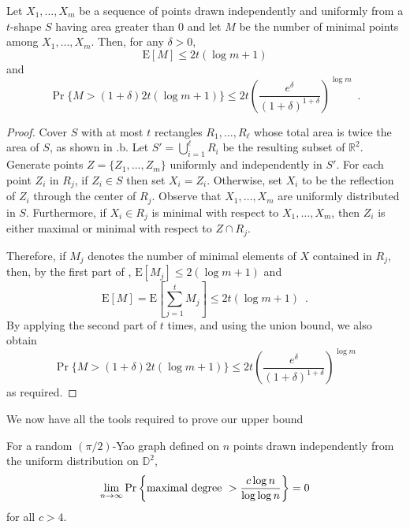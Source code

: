 \documentclass[lotsofwhite,charterfonts]{patmorin}
\newcommand{\RR}{\mathbb{R}}
\newcommand{\D}{\mathbb{D}}
\newcommand{\PROB}{\Pr}
\newcommand{\EXP}{\mathrm{E}}
\begin{document}
\begin{lem}
  Let $X_1,\ldots,X_m$ be a sequence of points drawn independently and
  uniformly from a $t$-shape $S$ having area greater than
  0 and let $M$ be the number of minimal points
  among $X_1,\ldots,X_m$.  Then, for any $\delta >0$,
  \begin{equation}
    \EXP[M] \le 2t(\log m + 1)
  \end{equation}
  and 
  \begin{equation}
    \PROB\{M>(1+\delta)2t(\log m+1)\} 
        \le 2t\left(\frac{e^\delta}{(1+\delta)^{1+\delta}}\right)^{\log m} 
	\enspace .
  \end{equation}
\end{lem}

\begin{proof}
Cover $S$ with at most $t$ rectangles $R_1,\ldots,R_\ell$ whose total area
is twice the area of $S$, as shown in .b.  Let
$S'=\bigcup_{i=1}^\ell R_i$ be the resulting subset of $\RR^2$.  Generate
points $Z=\{Z_1,\ldots,Z_m\}$ uniformly and independently in $S'$.  For each
point $Z_i$ in $R_j$, if $Z_i\in S$ then set $X_i=Z_i$.  Otherwise, set
$X_i$ to be the reflection of $Z_i$ through the center of $R_j$.  Observe
that $X_1,\ldots,X_m$ are uniformly distributed in $S$.  Furthermore, if
$X_i\in R_j$ is minimal with respect to $X_1,\ldots,X_m$, then $Z_i$ is either
maximal or minimal with respect to $Z \cap R_j$.

Therefore, if $M_j$ denotes the number of minimal elements of $X$ contained
in $R_j$, then, by the first part of , $\EXP[M_j]\le
2(\log m+1)$ and 
\[
     \EXP[M] = \EXP\left[\sum_{j=1}^t M_j\right] \le 2t(\log m + 1)
     \enspace .
\]
By applying the second part of  $t$ times,
and using the union bound, we also obtain
\[
    \PROB\{M>(1+\delta)2t(\log m+1)\} 
        \le 2t\left(\frac{e^\delta}{(1+\delta)^{1+\delta}}\right)^{\log m} 
\]
as required.
\end{proof}

We now have all the tools required to prove our upper bound

\begin{thm}
For a random $(\pi/2)$-Yao graph defined on $n$ points drawn
independently from the uniform distribution on
$\D^2$, 
\[
\lim_{n\to\infty} \PROB \left\{ \hbox{\rm maximal degree}~> {c \log n \over
\log \log n} \right\} = 0
\]
for all $c > 4$.
\end{thm}
\end{document}

